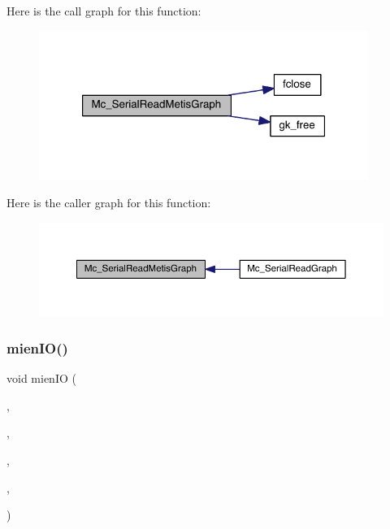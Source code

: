 Here is the call graph for this function\+:\nopagebreak
\begin{figure}[H]
\begin{center}
\leavevmode
\includegraphics[width=304pt]{a00954_a6228d68f75df6d736a0748c1cab40862_cgraph}
\end{center}
\end{figure}
Here is the caller graph for this function\+:\nopagebreak
\begin{figure}[H]
\begin{center}
\leavevmode
\includegraphics[width=350pt]{a00954_a6228d68f75df6d736a0748c1cab40862_icgraph}
\end{center}
\end{figure}
\mbox{\label{a00954_a855b1b16b584ec260a2bdac3f03c6de5}} 
\subsubsection{\texorpdfstring{mien\+I\+O()}{mienIO()}}
{\footnotesize\ttfamily void mien\+IO (\begin{DoxyParamCaption}\item[{\hyperlink{a00738}{mesh\+\_\+t} $\ast$}]{,  }\item[{char $\ast$}]{,  }\item[{\hyperlink{a00876_aaa5262be3e700770163401acb0150f52}{idx\+\_\+t}}]{,  }\item[{\hyperlink{a00876_aaa5262be3e700770163401acb0150f52}{idx\+\_\+t}}]{,  }\item[{M\+P\+I\+\_\+\+Comm}]{ }\end{DoxyParamCaption})}

